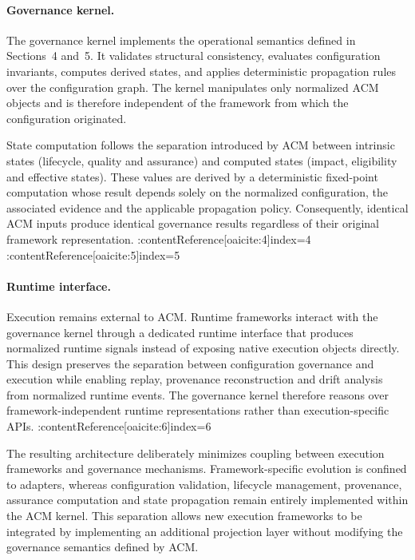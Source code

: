 \documentclass[10pt]{article}
\begin{document}
\paragraph{Governance kernel.}

The governance kernel implements the operational semantics defined in Sections~4 and~5. It validates structural consistency, evaluates configuration invariants, computes derived states, and applies deterministic propagation rules over the configuration graph. The kernel manipulates only normalized ACM objects and is therefore independent of the framework from which the configuration originated.

State computation follows the separation introduced by ACM between intrinsic states (lifecycle, quality and assurance) and computed states (impact, eligibility and effective states). These values are derived by a deterministic fixed-point computation whose result depends solely on the normalized configuration, the associated evidence and the applicable propagation policy. Consequently, identical ACM inputs produce identical governance results regardless of their original framework representation. :contentReference[oaicite:4]{index=4} :contentReference[oaicite:5]{index=5}

\paragraph{Runtime interface.}

Execution remains external to ACM. Runtime frameworks interact with the governance kernel through a dedicated runtime interface that produces normalized runtime signals instead of exposing native execution objects directly. This design preserves the separation between configuration governance and execution while enabling replay, provenance reconstruction and drift analysis from normalized runtime events. The governance kernel therefore reasons over framework-independent runtime representations rather than execution-specific APIs. :contentReference[oaicite:6]{index=6}

The resulting architecture deliberately minimizes coupling between execution frameworks and governance mechanisms. Framework-specific evolution is confined to adapters, whereas configuration validation, lifecycle management, provenance, assurance computation and state propagation remain entirely implemented within the ACM kernel. This separation allows new execution frameworks to be integrated by implementing an additional projection layer without modifying the governance semantics defined by ACM.
\end{document}
